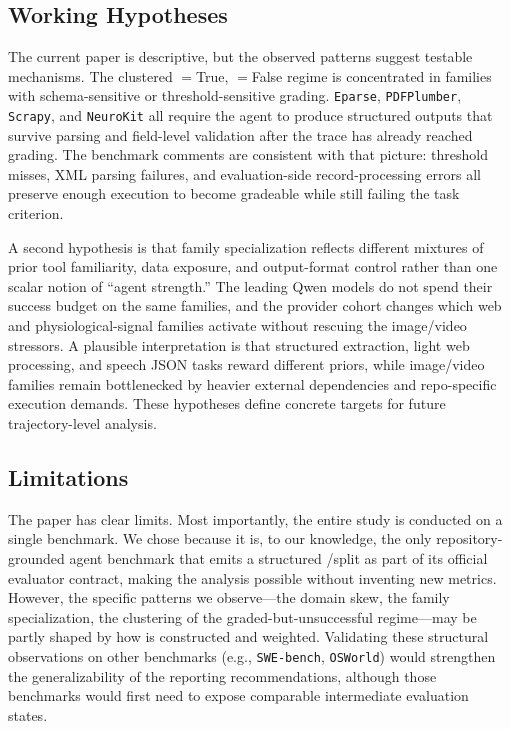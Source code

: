 \subsection{Working Hypotheses}

The current paper is descriptive, but the observed patterns suggest testable
mechanisms. The clustered \processmetric$=$True, \resultmetric$=$False regime
is concentrated in families with schema-sensitive or threshold-sensitive
grading. \texttt{Eparse}, \texttt{PDFPlumber}, \texttt{Scrapy}, and
\texttt{NeuroKit} all require the agent to produce structured outputs that
survive parsing and field-level validation after the trace has already reached
grading. The benchmark comments are consistent with that picture: threshold
misses, XML parsing failures, and evaluation-side record-processing errors all
preserve enough execution to become gradeable while still failing the task
criterion.

A second hypothesis is that family specialization reflects different mixtures of
prior tool familiarity, data exposure, and output-format control rather than one
scalar notion of ``agent strength.'' The leading Qwen models do not spend their
success budget on the same families, and the provider cohort changes which web
and physiological-signal families activate without rescuing the image/video
stressors. A plausible interpretation is that structured extraction, light web
processing, and speech JSON tasks reward different priors, while image/video
families remain bottlenecked by heavier external dependencies and repo-specific
execution demands. These hypotheses define concrete targets for future
trajectory-level analysis.

\subsection{Limitations}

The paper has clear limits. Most importantly, the entire study is conducted on
a single benchmark. We chose \gittaskbench because it is, to our knowledge, the
only repository-grounded agent benchmark that emits a structured
\processmetric/\resultmetric split as part of its official evaluator contract,
making the analysis possible without inventing new metrics. However, the
specific patterns we observe---the domain skew, the family specialization, the
clustering of the graded-but-unsuccessful regime---may be partly shaped by how
\gittaskbench is constructed and weighted. Validating these structural
observations on other benchmarks (e.g., \texttt{SWE-bench}, \texttt{OSWorld})
would strengthen the generalizability of the reporting recommendations,
although those benchmarks would first need to expose comparable intermediate
evaluation states.

